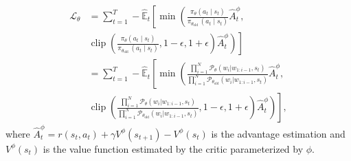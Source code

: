 \documentclass[letterpaper]{article} %
\begin{document}
\begin{equation}
\begin{aligned}
    \mathcal{L}_\theta 
    &= \sum_{t=1}^T -\hat{\mathbb{E}}_{t}\left[\min \left(\frac{\pi_{\theta}\left(a_{t} \mid s_{t}\right)}{\pi_{\theta_{\text {old }}}\left(a_{t} \mid s_{t}\right)}  \hat{A}_{t}^\phi, \right . \right .\\ & \left . \left . \operatorname{clip}\left(\frac{\pi_{\theta}\left(a_{t} \mid s_{t}\right)}{\pi_{\theta_{\text {old }}}\left(a_{t} \mid s_{t}\right)}, 1-\epsilon, 1+\epsilon\right) 
    \hat{A}_{t}^\phi \right)\right]  \\
    &= \sum_{t=1}^T -\hat{\mathbb{E}}_{t}\left[\min \left(\frac{    \prod_{i = 1}^{N}\mathcal{P}_{\theta}(w_i|w_{1:i-1}, s_t)}{\prod_{i = 1}^{N}\mathcal{P}_{\theta_{\text{old}}}(w_i|w_{1:i-1}, s_t)}  \hat{A}_{t}^\phi, \right . \right .\\ & \left . \left . \operatorname{clip}\left(\frac{\prod_{i = 1}^{N}\mathcal{P}_{\theta}(w_i|w_{1:i-1}, s_t)}{\prod_{i = 1}^{N}\mathcal{P}_{\theta_{\text{old}}}(w_i|w_{1:i-1}, s_t)}, 1-\epsilon, 1+\epsilon\right) \hat{A}_{t}^\phi\right)\right], 
\end{aligned}
\end{equation}
where $\hat{A}_{t}^\phi = r(s_t, a_t) + \gamma V^\phi(s_{t+1}) - V^\phi(s_t)$ is the advantage estimation and $V^\phi(s_t)$ is the value function estimated by the critic parameterized by $\phi$.



\end{document}
